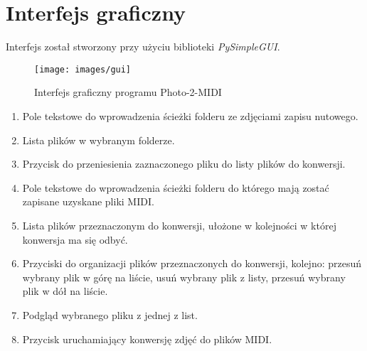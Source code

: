\section{Interfejs graficzny}

Interfejs został stworzony przy użyciu biblioteki \textit{PySimpleGUI}.

\begin{figure}[h]
	\centering
	\texttt{[image: images/gui]}
	\caption{Interfejs graficzny programu Photo-2-MIDI}
	\label{fig:gui}
\end{figure}

\begin{enumerate}
	\item Pole tekstowe do wprowadzenia ścieżki folderu ze zdjęciami zapisu nutowego.
	\item Lista plików w wybranym folderze.
	\item Przycisk do przeniesienia zaznaczonego pliku do listy plików do konwersji.
	\item Pole tekstowe do wprowadzenia ścieżki folderu do którego mają zostać zapisane uzyskane pliki MIDI.
	\item Lista plików przeznaczonym do konwersji, ułożone w kolejności w której konwersja ma się odbyć.
	\item Przyciski do organizacji plików przeznaczonych do konwersji, kolejno: przesuń wybrany plik w górę na liście, usuń wybrany plik z listy, przesuń wybrany plik w dół na liście.
	\item Podgląd wybranego pliku z jednej z list.
	\item Przycisk uruchamiający konwersję zdjęć do plików MIDI.
\end{enumerate}